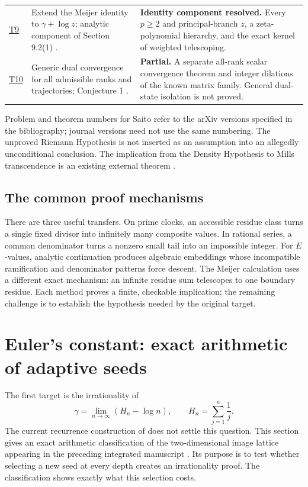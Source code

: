 \documentclass[11pt,a4paper]{article}
\numberwithin{equation}{section}
\theoremstyle{definition}
\theoremstyle{remark}
\begin{document}
\begin{longtable}{@{}p{}p{}p{}@{}}
\hyperref[cmf:extension]{T9} & Extend the Meijer identity to $\gamma+\log z$; analytic component of Section 9.2(1) \cite{CMF2026}. & \textbf{Identity component resolved.} Every $p\ge2$ and principal-branch $z$, a zeta-polynomial hierarchy, and the exact kernel of weighted telescoping.\\[7pt]
\hyperref[cmf:convergence]{T10} & Generic dual convergence for all admissible ranks and trajectories; Conjecture 1 \cite{CMF2026}. & \textbf{Partial.} A separate all-rank scalar convergence theorem and integer dilations of the known matrix family. General dual-state isolation is not proved.\\
\bottomrule
\end{longtable}
\normalsize

Problem and theorem numbers for Saito refer to the arXiv versions
specified in the bibliography; journal versions need not use the same
numbering. The unproved Riemann Hypothesis is not inserted as an
assumption into an allegedly unconditional conclusion. The implication
from the Density Hypothesis to Mills transcendence is an existing
external theorem \cite{SaitoVariants}.

\subsection{The common proof mechanisms}

There are three useful transfers. On prime clocks, an accessible residue
class turns a single fixed divisor into infinitely many composite
values. In rational series, a common denominator turns a nonzero small
tail into an impossible integer. For $E$-values, analytic continuation
produces algebraic embeddings whose incompatible ramification and
denominator patterns force descent. The Meijer calculation uses a
different exact mechanism: an infinite residue sum telescopes to one
boundary residue. Each method proves a finite, checkable implication;
the remaining challenge is to establish the hypothesis needed by the
original target.


\section{Euler's constant: exact arithmetic of adaptive seeds}
\label{ext:gamma}

The first target is the irrationality of
\[
 \gamma=\lim_{n\to\infty}(H_n-\log n),\qquad
 H_n=\sum_{j=1}^n\frac1j.
\]
The current recurrence construction of \cite{CMF2026} does not settle
this question. This section gives an exact arithmetic classification
of the two-dimensional image lattice appearing in the preceding
integrated manuscript \cite{Integrated2026}. Its purpose is to test
whether selecting a new seed at every depth creates an irrationality
proof. The classification shows exactly what this selection costs.
\end{document}
